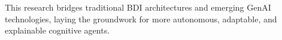 \documentclass[12pt,a4paper,openright,twoside]{book}
\begin{document}
This research bridges traditional \ac{BDI} architectures and emerging \ac{GenAI} technologies,
laying the groundwork for more autonomous, adaptable, and explainable cognitive agents.


\backmatter%
\printbibliography%
\end{document}
